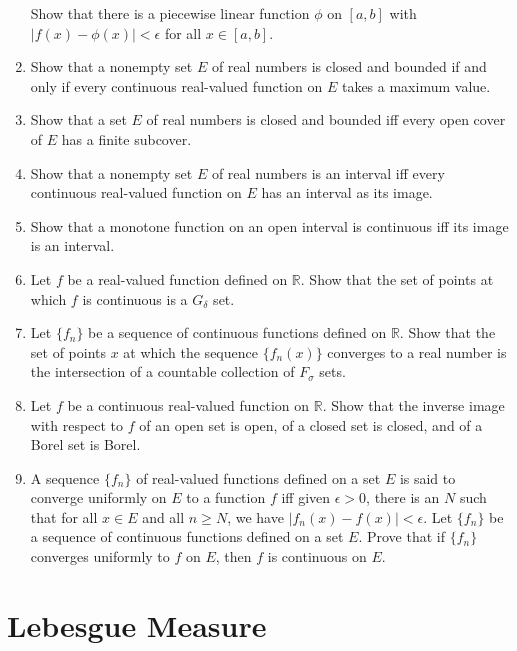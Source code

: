 \documentclass[a4paper,10pt]{book}
\theoremstyle{plain} %
\begin{document}
\begin{enumerate}
	Show that there is a piecewise linear function $\phi$ on $[a,b]$ with $|f(x)-\phi (x)| < \epsilon$ for all $x \in [a,b]$.
	\item Show that a nonempty set $E$ of real numbers is closed and bounded if and only if every continuous real-valued function on $E$ takes a maximum value.
	\item Show that a set $E$ of real numbers is closed and bounded iff every open cover of $E$ has a finite subcover.
	\item Show that a nonempty set $E$ of real numbers is an interval iff every continuous real-valued function on $E$ has an interval as its image.
	\item Show that a monotone function on an open interval is continuous iff its image is an interval. 
	\item Let $f$ be a real-valued function defined on $\mathbb{R}$. Show that the set of points at which $f$ is continuous is a $G_\delta$ set.
	\item Let $\{ f_n\}$ be a sequence of continuous functions defined on $\mathbb{R}$. Show that the set of points $x$ at which the sequence $\{f_n(x)\}$ converges to a real number is the intersection of a countable collection of $F_\sigma$ sets.
	\item Let $f$ be a continuous real-valued function on $\mathbb{R}$. Show that the inverse image with respect to $f$ of an open set is open, of a closed set is closed, and of a Borel set is Borel.
	\item A sequence $\{f_n\}$ of real-valued functions defined on a set $E$ is said to converge uniformly on $E$ to a function $f$ iff given $\epsilon >0$, there is an $N$ such that for all $x \in E$ and all $n \ge N$, we have $|f_n(x) - f(x)| < \epsilon$. Let $\{f_n\}$ be a sequence of continuous functions defined on a set $E$. Prove that if $\{f_n\}$ converges uniformly to $f$ on $E$, then $f$ is continuous on $E$. 
\end{enumerate}

\chapter{Lebesgue Measure}
\end{document}
